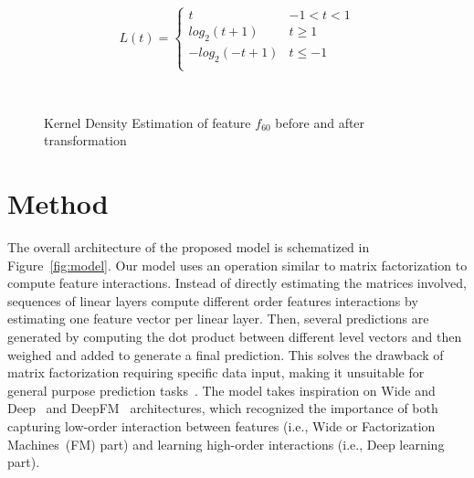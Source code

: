 \documentclass[manuscript,nonacm]{acmart}
\begin{document}
\begin{equation}\label{eq:L2}
L\left(t\right) = \begin{cases}
                        t & -1 < t < 1\\
                        log_2\left(t+1\right) & t \geq 1\\
                        -log_2\left(-t+1\right) & t \leq -1\\
\end{cases}
\end{equation}\vspace{-0.95cm}

\begin{figure*}
    \centering

    ~
    \vspace{-0.2cm}

    \caption{Kernel Density Estimation of feature $f_60$ before and after transformation}
    \label{fig:feature-transformation}\vspace{-0.5cm}
\end{figure*}

\section{Method}\label{sec:model}

The overall architecture of the proposed model is schematized in Figure~\ref{fig:model}. Our model uses an operation similar to matrix factorization to compute feature interactions. Instead of directly estimating the matrices involved, sequences of linear layers compute different order features interactions by estimating one feature vector per linear layer. Then, several predictions are generated by computing the dot product between different level vectors and then weighed and added to generate a final prediction. This solves the drawback of matrix factorization requiring specific data input, making it unsuitable for general purpose prediction tasks~\cite{fm2010}. The model takes inspiration on Wide and Deep~\cite{wdlrs16} and DeepFM~\cite{deepfm17} architectures, which recognized the importance of both capturing low-order interaction between features (i.e., Wide or Factorization Machines~(FM) part) and learning high-order interactions (i.e., Deep learning part).
\end{document}

